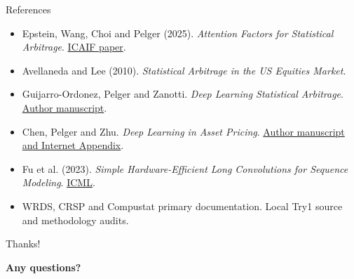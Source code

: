 \documentclass[11pt]{beamer}
\newcommand{\claim}[1]{%
  \par{\color{SBred}\bfseries #1\par}
}
\begin{document}
\begin{frame}{References}
\scriptsize
\begin{itemize}
\item Epstein, Wang, Choi and Pelger (2025). \emph{Attention Factors for Statistical Arbitrage}. \href{https://doi.org/10.1145/3768292.3770398}{ICAIF paper}.
\item Avellaneda and Lee (2010). \emph{Statistical Arbitrage in the US Equities Market}.
\item Guijarro-Ordonez, Pelger and Zanotti. \emph{Deep Learning Statistical Arbitrage}. \href{https://arxiv.org/abs/2106.04028}{Author manuscript}.
\item Chen, Pelger and Zhu. \emph{Deep Learning in Asset Pricing}. \href{https://arxiv.org/abs/1904.00745}{Author manuscript and Internet Appendix}.
\item Fu et al. (2023). \emph{Simple Hardware-Efficient Long Convolutions for Sequence Modeling}. \href{https://proceedings.mlr.press/v202/fu23a.html}{ICML}.
\item WRDS, CRSP and Compustat primary documentation. Local Try1 source and methodology audits.
\end{itemize}
\end{frame}




\begin{frame}{Thanks!}
\claim{Any questions?} 
\end{frame}
\end{document}
